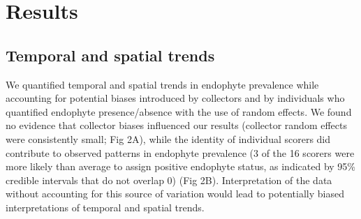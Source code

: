 \documentclass[11pt]{article}
\begin{document}


		
\section*{Results}
\subsection*{Temporal and spatial trends}
We quantified temporal and spatial trends in endophyte prevalence while accounting for potential biases introduced by collectors and by individuals who quantified endophyte presence/absence with the use of random effects. We found no evidence that collector biases influenced our results (collector random effects were consistently small; Fig 2A), while the identity of individual scorers did contribute to observed patterns in endophyte prevalence (3 of the 16 scorers were more likely than average to assign positive endophyte status, as indicated by 95\% credible intervals that do not overlap 0) (Fig 2B). Interpretation of the data without accounting for this source of variation would lead to potentially biased interpretations of temporal and spatial trends.
\end{document}
